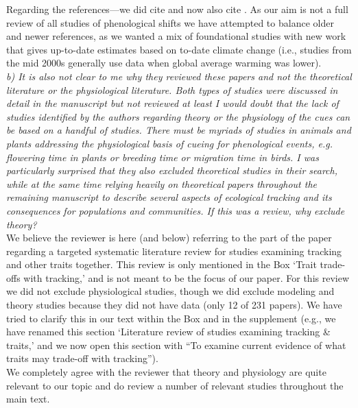 \documentclass[11pt]{article}
\begin{document}
Regarding the references---we did cite \citet{Menzel:2006xn} and now also cite \citet{Parmesan:2006cr}. As our aim is not a full review of all studies of phenological shifts we have attempted to balance older and newer references, as we wanted a mix of foundational studies with new work that gives up-to-date estimates based on to-date climate change (i.e., studies from the mid 2000s generally use data when global average warming was lower).\\

\emph{b) It is also not clear to me why they reviewed these papers and not the theoretical
literature or the physiological literature. Both types of studies were discussed in detail in
the manuscript but not reviewed at least I would doubt that the lack of studies identified
by the authors regarding theory or the physiology of the cues can be based on a handful of
studies. There must be myriads of studies in animals and plants addressing the physiological
basis of cueing for phenological events, e.g. flowering time in plants or breeding time or
migration time in birds. I was particularly surprised that they also excluded theoretical
studies in their search, while at the same time relying heavily on theoretical papers
throughout the remaining manuscript to describe several aspects of ecological tracking and
its consequences for populations and communities. If this was a review, why exclude theory?}\\

We believe the reviewer is here (and below) referring to the part of the paper regarding a targeted systematic literature review for studies examining tracking and other traits together. This review is only mentioned in the Box `Trait trade-offs with tracking,' and is not meant to be the focus of our paper. For this review we did not exclude physiological studies, though we did exclude modeling and theory studies because they did not have data (only 12 of 231 papers). We have tried to clarify this in our text within the Box and in the supplement (e.g., we have renamed this section `Literature review of studies examining tracking \& traits,' and we now open this section with ``To examine current evidence of what traits may trade-off with tracking''). \\

We completely agree with the reviewer that theory and physiology are quite relevant to our topic and do review a number of relevant studies throughout the main text.\\
\end{document}
